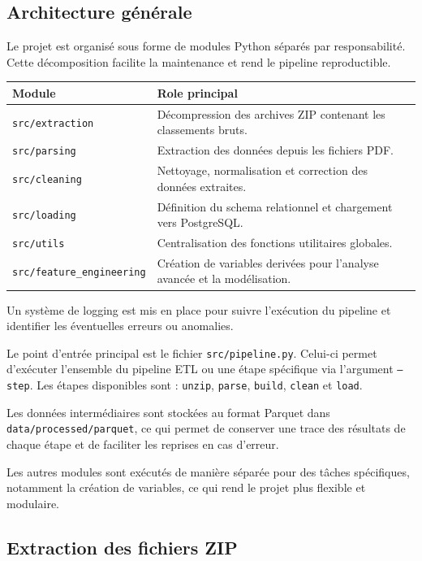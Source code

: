 \documentclass[12pt,a4paper]{article}
\begin{document}
\subsection{Architecture générale}

Le projet est organisé sous forme de modules Python séparés par responsabilité. Cette décomposition facilite la maintenance et rend le pipeline reproductible.

\begin{longtable}{p{5.2cm}p{8.8cm}}
\toprule
\textbf{Module} & \textbf{Role principal} \\
\midrule
\texttt{src/extraction} & Décompression des archives ZIP contenant les classements bruts. \\
\texttt{src/parsing} & Extraction des données depuis les fichiers PDF. \\
\texttt{src/cleaning} & Nettoyage, normalisation et correction des données extraites. \\
\texttt{src/loading} & Définition du schema relationnel et chargement vers PostgreSQL. \\
\texttt{src/utils} & Centralisation des fonctions utilitaires globales. \\
\texttt{src/feature\_engineering} & Création de variables derivées pour l'analyse avancée et la modélisation. \\
\bottomrule
\end{longtable}

Un système de logging est mis en place pour suivre l'exécution du pipeline et identifier les éventuelles erreurs ou anomalies.

Le point d'entrée principal est le fichier \texttt{src/pipeline.py}. Celui-ci permet d'exécuter l'ensemble du pipeline ETL ou une étape spécifique via l'argument \texttt{--step}. Les étapes disponibles sont : \texttt{unzip}, \texttt{parse}, \texttt{build}, \texttt{clean} et \texttt{load}.

Les données intermédiaires sont stockées au format Parquet dans \texttt{data/processed/parquet}, ce qui permet de conserver une trace des résultats de chaque étape et de faciliter les reprises en cas d'erreur.

Les autres modules sont exécutés de manière séparée pour des tâches spécifiques, notamment la création de variables, ce qui rend le projet plus flexible et modulaire.

\subsection{Extraction des fichiers ZIP}
\end{document}
